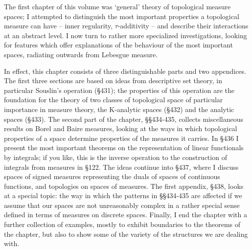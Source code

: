 
\def\chaptername{Topologies and measures II}
\def\sectionname{Introduction}


The first chapter of this volume was `general' theory of topological
measure spaces;  I attempted to distinguish the most important
properties a topological measure can have -- inner regularity,
$\tau$-additivity -- and describe their interactions at an abstract
level.   I now turn to rather more specialized investigations, looking
for features which offer explanations of the behaviour of the most
important spaces, radiating outwards from Lebesgue measure.

In effect, this chapter consists of three
distinguishable parts and two appendices.   The first three sections are
based on ideas from descriptive set theory, in particular Souslin's
operation (\S431);  the properties of this operation are the foundation
for the theory of two classes of topological space of particular
importance in measure theory, the
K-analytic spaces (\S432) and the analytic spaces (\S433).
The second part of the chapter, \S\S434-435, collects
miscellaneous results on Borel and Baire measures, looking at the ways
in which topological properties of a space determine properties of the
measures it carries.   In \S436 I
present the most important theorems on the
representation of linear functionals by integrals;  if you like, this is
the inverse operation to the construction of integrals from measures in
\S122.   The ideas continue into \S437, where I discuss spaces of signed
measures representing the duals of spaces of continuous functions, and
topologies on spaces of measures.
The first appendix, \S438, looks at a
special topic:  the way in which
the patterns in \S\S434-435 are affected if we assume that our spaces
are not unreasonably complex in a rather
special sense defined in terms of measures on discrete spaces.
Finally, I end the chapter with a further collection of
examples, mostly to exhibit boundaries to the theorems of the chapter,
but also to show some of the variety of the structures we are dealing
with.

\discrpage

